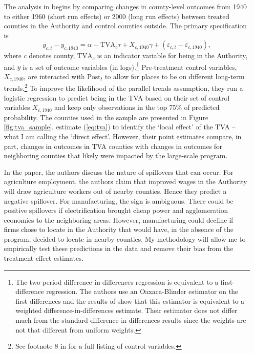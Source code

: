 \documentclass[11pt]{article}
\begin{document}
The analysis in \citet{Kline_Moretti_2014} begins by comparing changes in county-level outcomes from 1940 to either 1960 (short run effects) or 2000 (long run effects) between treated counties in the Authority and control counties outside. The primary specification is
\begin{equation}\label{eq:tva}
    y_{c, t} - y_{c, 1940} = \alpha + \text{TVA}_c \tau + X_{c, 1940} \gamma + (\varepsilon_{c, t} - \varepsilon_{c, 1940}),
\end{equation}
where $c$ denotes county, $\text{TVA}_c$ is an indicator variable for being in the Authority, and $y$ is a set of outcome variables (in logs).\footnote{The two-period difference-in-differences regression is equivalent to a first-difference regression. The authors use an Oaxaca-Blinder estimator on the first differences and the results of \citet{Kline_2011} show that this estimator is equivalent to a weighted difference-in-differences estimate. Their estimator does not differ much from the standard difference-in-differences results since the weights are not that different from uniform weights.} Pre-treatment control variables, $X_{c,1940}$, are interacted with $\text{Post}_t$ to allow for places to be on different long-term trends.\footnote{See footnote 8 in \citet{Kline_Moretti_2014} for a full listing of control variables.} To improve the likelihood of the parallel trends assumption, they run a logistic regression to predict being in the TVA based on their set of control variables $X_{c,1940}$ and keep only observations in the top 75\% of predicted probability. The counties used in the sample are presented in Figure \ref{fig:tva_sample}. \citet{Kline_Moretti_2014} estimate (\ref{eq:tva}) to identify the `local effect' of the TVA -- what I am calling the `direct effect'. However, their point estimates compare, in part, changes in outcomes in TVA counties with changes in outcomes for neighboring counties that likely were impacted by the large-scale program. 

In the paper, the authors discuss the nature of spillovers that can occur. For agriculture employment, the authors claim that improved wages in the Authority will draw agriculture workers out of nearby counties. Hence they predict a negative spillover. For manufacturing, the sign is ambiguous. There could be positive spillovers if electrification brought cheap power and agglomeration economies to the neighboring areas. However, manufacturing could decline if firms chose to locate in the Authority that would have, in the absence of the program, decided to locate in nearby counties. My methodology will allow me to empirically test these predictions in the data and remove their bias from the treatment effect estimates. 
\end{document}
